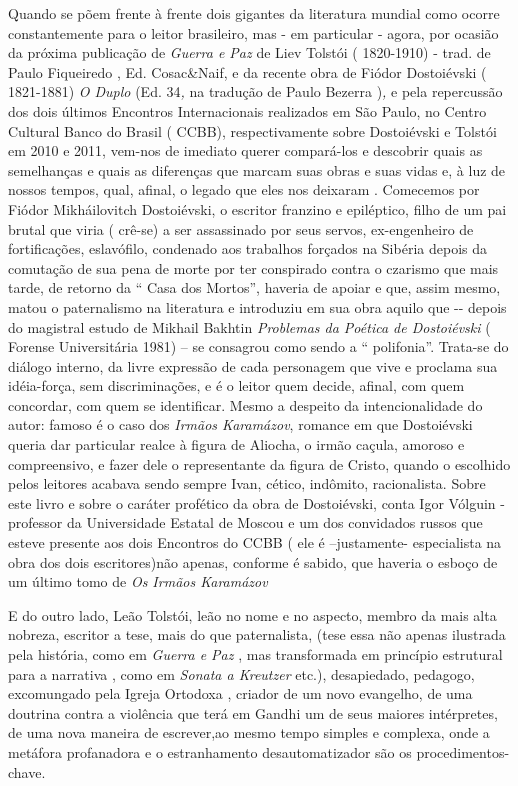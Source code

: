 Quando se põem frente à frente dois gigantes da literatura mundial como
ocorre constantemente para o leitor brasileiro, mas - em particular -
agora, por ocasião da próxima publicação de \emph{Guerra e Paz} de Liev
Tolstói ( 1820-1910) - trad. de Paulo Fiqueiredo , Ed. Cosac\&Naif, e da
recente obra de Fiódor Dostoiévski ( 1821-1881) \emph{O Duplo} (Ed.
34\emph{,} na tradução de Paulo Bezerra )\emph{,} e pela repercussão dos
dois últimos Encontros Internacionais realizados em São Paulo, no Centro
Cultural Banco do Brasil ( CCBB), respectivamente sobre Dostoiévski e
Tolstói em 2010 e 2011, vem-nos de imediato querer compará-los e
descobrir quais as semelhanças e quais as diferenças que marcam suas
obras e suas vidas e, à luz de nossos tempos, qual, afinal, o legado que
eles nos deixaram . Comecemos por Fiódor Mikháilovitch Dostoiévski, o
escritor franzino e epiléptico, filho de um pai brutal que viria (
crê-se) a ser assassinado por seus servos, ex-engenheiro de
fortificações, eslavófilo, condenado aos trabalhos forçados na Sibéria
depois da comutação de sua pena de morte por ter conspirado contra o
czarismo que mais tarde, de retorno da `` Casa dos Mortos'', haveria de
apoiar e que, assim mesmo, matou o paternalismo na literatura e
introduziu em sua obra aquilo que -\/- depois do magistral estudo de
Mikhail Bakhtin \emph{Problemas da Poética de Dostoiévski} ( Forense
Universitária 1981) -- se consagrou como sendo a `` polifonia''.
Trata-se do diálogo interno, da livre expressão de cada personagem que
vive e proclama sua idéia-força, sem discriminações, e é o leitor quem
decide, afinal, com quem concordar, com quem se identificar. Mesmo a
despeito da intencionalidade do autor: famoso é o caso dos \emph{Irmãos
Karamázov}, romance em que Dostoiévski queria dar particular realce à
figura de Aliocha, o irmão caçula, amoroso e compreensivo, e fazer dele
o representante da figura de Cristo, quando o escolhido pelos leitores
acabava sendo sempre Ivan, cético, indômito, racionalista. Sobre este
livro e sobre o caráter profético da obra de Dostoiévski, conta Igor
Vólguin - professor da Universidade Estatal de Moscou e um dos
convidados russos que esteve presente aos dois Encontros do CCBB ( ele é
--justamente- especialista na obra dos dois escritores)não apenas,
conforme é sabido, que haveria o esboço de um último tomo de \emph{Os
Irmãos Karamázov}

E do outro lado, Leão Tolstói, leão no nome e no aspecto, membro da mais
alta nobreza, escritor a tese, mais do que paternalista, (tese essa não
apenas ilustrada pela história, como em \emph{Guerra e Paz} , mas
transformada em princípio estrutural para a narrativa , como em
\emph{Sonata a Kreutzer} etc.), desapiedado, pedagogo, excomungado pela
Igreja Ortodoxa , criador de um novo evangelho, de uma doutrina contra a
violência que terá em Gandhi um de seus maiores intérpretes, de uma nova
maneira de escrever,ao mesmo tempo simples e complexa, onde a metáfora
profanadora e o estranhamento desautomatizador são os
procedimentos-chave.

